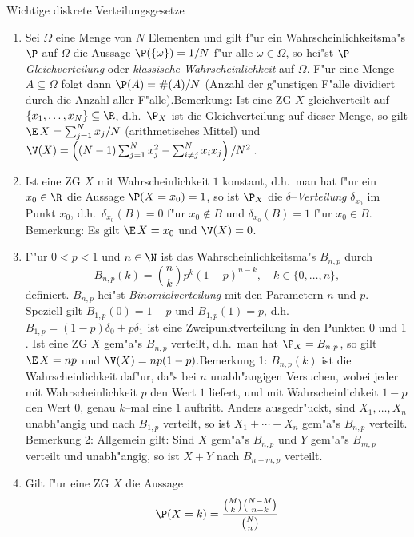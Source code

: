 \item
{\large Wichtige diskrete Verteilungsgesetze}
\begin{enumerate}
\item
Sei $\Omega$ eine Menge von $N$ Elementen und gilt f"ur ein
Wahrscheinlichkeitsma"s $\P$ auf $\Omega$ die Aussage
$\P(\{\omega\})=1/N$ f"ur alle $\omega\in \Omega$, so hei"st $\P$
{\it Gleichverteilung}  oder  {\it klassische Wahrscheinlichkeit}
auf $\Omega$. F"ur eine Menge $A\subseteq \Omega$ folgt dann
$\P(A)=\#(A)/N$ (Anzahl der g"unstigen F"alle dividiert durch die
Anzahl aller F"alle).\newline Bemerkung: Ist eine ZG $X$
gleichverteilt auf $\{x_1,\ldots,x_N\}\subseteq\R$, d.h.~$\P_X$ ist
die Gleichverteilung auf dieser Menge, so gilt ${\E}\,X=\sum_{j=1}^N
x_j/N$ (arithmetisches Mittel) und $\V(X)=\left((N-1)\sum_{j=1}^N
x_j^2 -\sum_{i\not=j}^N x_ix_j\right)/N^2\;.$
\item
Ist eine ZG $X$ mit Wahrscheinlichkeit $1$ konstant, d.h.~man hat
f"ur ein $x_0\in \R$ die Aussage $\P(X=x_0)=1$, so ist $\P_X$ die
$\delta$--{\it Verteilung} $\delta_{x_0}$ im Punkt $x_0$,
d.h.~$\delta_{x_0}(B)=0$ f"ur $x_0\notin B$ und $\delta_{x_0}(B)=1$
f"ur $x_0\in B$. \newline Bemerkung: Es gilt ${\E}\,X =x_0$ und
$\V(X)=0$.
\item
F"ur $0<p<1$ und $n\in\N$ ist das Wahrscheinlichkeitsma"s $B_{n,p} $
durch
\[B_{n,p}(k)={n\choose k} p^k(1-p)^{n-k},\quad k\in\{0,\ldots,n\},\]
definiert. $B_{n,p}$ hei"st {\it Binomialverteilung} mit den
Parametern $n$ und $p$.
Speziell gilt $B_{1,p}(0)=1-p$ und $B_{1,p}(1)=p$, d.h.~%
$B_{1,p}=(1-p)\delta_0+p\delta_1$ ist eine Zweipunktverteilung in
den Punkten 0 und 1 . Ist eine ZG $X$ gem"a"s $B_{n,p}$ verteilt,
d.h.~man hat $\P_X=B_{n,p}$, so gilt ${\E}\,X =np$ und
$\V(X)=np(1-p)$.\newline Bemerkung 1: $B_{n,p}(k)$ ist die
Wahrscheinlichkeit daf"ur, da"s bei $n$ unabh"angigen Versuchen,
wobei jeder mit Wahrscheinlichkeit $p$ den Wert $1$ liefert, und mit
Wahrscheinlichkeit $1-p$ den Wert $0$, genau $k$--mal eine $1$
auftritt. Anders ausgedr"uckt, sind $X_1,\ldots,X_n$ unabh"angig und
nach  $B_{1,p}$ verteilt, so ist $X_1+\cdots+X_n$ gem"a"s $B_{n,p}$
verteilt. \newline Bemerkung 2: Allgemein gilt: Sind $X$ gem"a"s
$B_{n,p}$ und $Y$ gem"a"s $B_{m,p}$ verteilt und unabh"angig, so ist
$X+Y$ nach $B_{n+m,p}$ verteilt.
\item
Gilt f"ur eine ZG $X$ die Aussage
\[\P(X=k)=\frac{{M\choose k}{N-M\choose n-k}}{{N\choose n}}\]

\end{enumerate}
